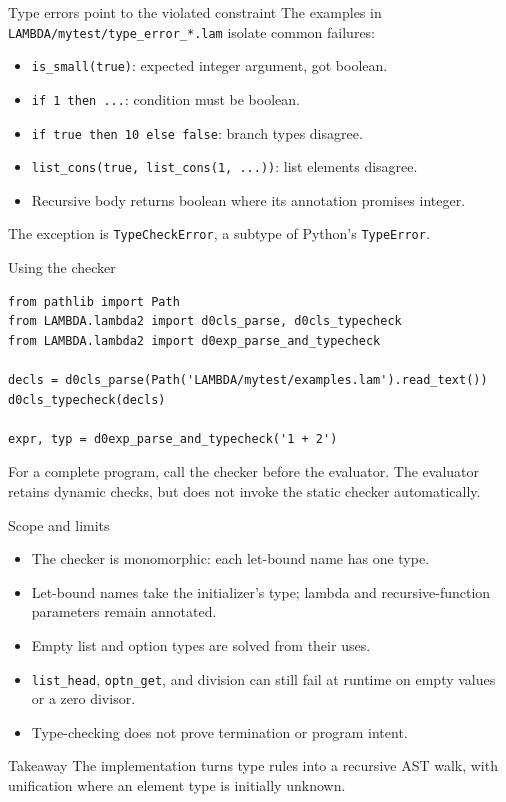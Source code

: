 \documentclass[aspectratio=169,11pt]{beamer}
\begin{document}
\begin{frame}{Type errors point to the violated constraint}
The examples in \texttt{LAMBDA/mytest/type\_error\_*.lam} isolate common failures:
\begin{itemize}
  \item \texttt{is\_small(true)}: expected integer argument, got boolean.
  \item \texttt{if 1 then ...}: condition must be boolean.
  \item \texttt{if true then 10 else false}: branch types disagree.
  \item \texttt{list\_cons(true, list\_cons(1, ...))}: list elements disagree.
  \item Recursive body returns boolean where its annotation promises integer.
\end{itemize}
The exception is \texttt{TypeCheckError}, a subtype of Python's \texttt{TypeError}.
\end{frame}

\begin{frame}[fragile]{Using the checker}
\begin{lstlisting}
from pathlib import Path
from LAMBDA.lambda2 import d0cls_parse, d0cls_typecheck
from LAMBDA.lambda2 import d0exp_parse_and_typecheck

decls = d0cls_parse(Path('LAMBDA/mytest/examples.lam').read_text())
d0cls_typecheck(decls)

expr, typ = d0exp_parse_and_typecheck('1 + 2')
\end{lstlisting}
For a complete program, call the checker before the evaluator. The evaluator retains dynamic checks, but does not invoke the static checker automatically.
\end{frame}

\begin{frame}{Scope and limits}
\begin{itemize}
  \item The checker is monomorphic: each let-bound name has one type.
  \item Let-bound names take the initializer's type; lambda and recursive-function parameters remain annotated.
  \item Empty list and option types are solved from their uses.
  \item \texttt{list\_head}, \texttt{optn\_get}, and division can still fail at runtime on empty values or a zero divisor.
  \item Type-checking does not prove termination or program intent.
\end{itemize}
\begin{block}{Takeaway}
The implementation turns type rules into a recursive AST walk, with unification where an element type is initially unknown.
\end{block}
\end{frame}
\end{document}
